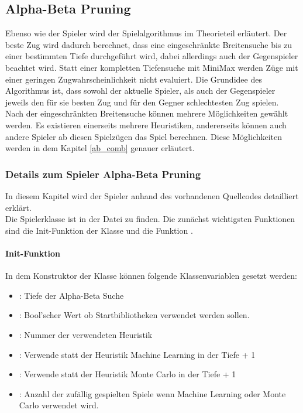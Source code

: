 \subsection{Alpha-Beta Pruning}
Ebenso wie der Spieler  wird der Spielalgorithmus im Theorieteil erläutert. Der beste Zug wird dadurch berechnet, dass eine eingeschränkte Breitensuche bis zu einer bestimmten Tiefe durchgeführt wird, dabei allerdings auch der Gegenspieler beachtet wird.
Statt einer kompletten Tiefensuche mit MiniMax werden Züge mit einer geringen Zugwahrscheinlichkeit nicht evaluiert. Die Grundidee des Algorithmus ist, dass sowohl der aktuelle Spieler, als auch der Gegenspieler jeweils den für sie besten Zug und für den Gegner schlechtesten Zug spielen.
\\Nach der eingeschränkten Breitensuche können mehrere Möglichkeiten gewählt werden.
Es existieren einerseits mehrere Heuristiken, andererseits können auch andere Spieler ab diesen Spielzügen das Spiel berechnen. Diese Möglichkeiten werden in dem Kapitel \ref{ab_comb} genauer erläutert.

\subsubsection{Details zum Spieler Alpha-Beta Pruning}
In diesem Kapitel wird der Spieler  anhand des vorhandenen Quellcodes detailliert erklärt.
\\Die Spielerklasse  ist in der Datei  zu finden.
Die zunächst wichtigsten Funktionen sind die Init-Funktion der Klasse und die Funktion .
\paragraph{Init-Funktion}
In dem Konstruktor der Klasse  können folgende Klassenvariablen gesetzt werden:
\begin{itemize}
\item {}: Tiefe der Alpha-Beta Suche
\item {}: Bool'scher Wert ob Startbibliotheken verwendet werden sollen.
\item {}: Nummer der verwendeten Heuristik
\item {}: Verwende statt der Heuristik Machine Learning in der Tiefe  + 1
\item {}: Verwende statt der Heuristik Monte Carlo in der Tiefe  + 1
\item {}: Anzahl der zufällig gespielten Spiele wenn Machine Learning oder Monte Carlo verwendet wird.
\end{itemize}

